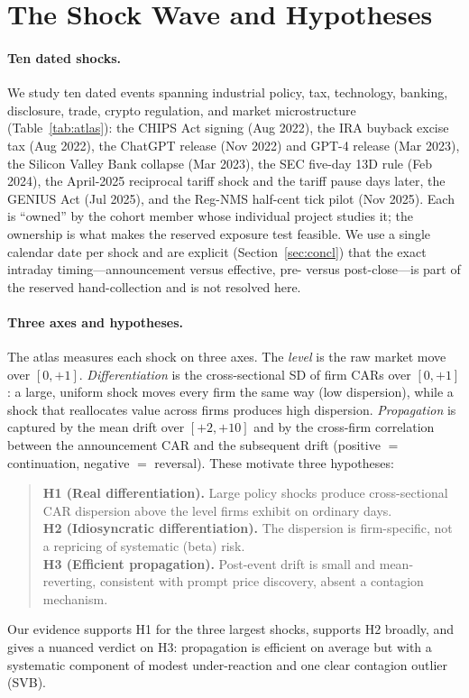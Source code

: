 \documentclass[12pt]{article}
\begin{document}
\section{The Shock Wave and Hypotheses}\label{sec:bg}
\paragraph{Ten dated shocks.} We study ten dated events spanning industrial policy, tax, technology,
banking, disclosure, trade, crypto regulation, and market microstructure (Table~\ref{tab:atlas}):
the CHIPS Act signing (Aug 2022), the IRA buyback excise tax (Aug 2022), the ChatGPT release (Nov
2022) and GPT-4 release (Mar 2023), the Silicon Valley Bank collapse (Mar 2023), the SEC five-day
13D rule (Feb 2024), the April-2025 reciprocal tariff shock and the tariff pause days later, the
GENIUS Act (Jul 2025), and the Reg-NMS half-cent tick pilot (Nov 2025). Each is ``owned'' by the
cohort member whose individual project studies it; the ownership is what makes the reserved
exposure test feasible. We use a single calendar date per shock and are explicit
(Section~\ref{sec:concl}) that the exact intraday timing---announcement versus effective, pre-
versus post-close---is part of the reserved hand-collection and is not resolved here.

\paragraph{Three axes and hypotheses.} The atlas measures each shock on three axes. The
\emph{level} is the raw market move over $[0,+1]$. \emph{Differentiation} is the cross-sectional SD
of firm CARs over $[0,+1]$: a large, uniform shock moves every firm the same way (low dispersion),
while a shock that reallocates value across firms produces high dispersion. \emph{Propagation} is
captured by the mean drift over $[+2,+10]$ and by the cross-firm correlation between the
announcement CAR and the subsequent drift (positive $=$ continuation, negative $=$ reversal). These
motivate three hypotheses:
\begin{quote}
\textbf{H1 (Real differentiation).} Large policy shocks produce cross-sectional CAR dispersion
above the level firms exhibit on ordinary days.\\
\textbf{H2 (Idiosyncratic differentiation).} The dispersion is firm-specific, not a repricing of
systematic (beta) risk.\\
\textbf{H3 (Efficient propagation).} Post-event drift is small and mean-reverting, consistent with
prompt price discovery, absent a contagion mechanism.
\end{quote}
Our evidence supports H1 for the three largest shocks, supports H2 broadly, and gives a nuanced
verdict on H3: propagation is efficient on average but with a systematic component of modest
under-reaction and one clear contagion outlier (SVB).
\end{document}

